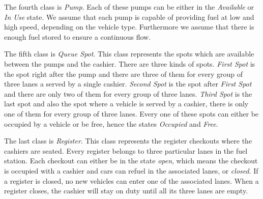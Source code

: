 The fourth class is \textit{Pump}.
Each of these pumps can be either in the \textit{Available} or \textit{In Use} state.
We assume that each pump is capable of providing fuel at low and high speed, depending on the vehicle type.
Furthermore we assume that there is enough fuel stored to ensure a continuous flow.

The fifth class is \textit{Queue Spot}.
This class represents the spots which are available between the pumps and the cashier.
There are three kinds of spots.
\textit{First Spot} is the spot right after the pump and there are three of them for every group of three lanes a served by a single cashier.
\textit{Second  Spot} is the spot after \textit{First Spot} and there are only two of them for every group of three lanes.
\textit{Third Spot} is the last spot and also the spot where a vehicle is served by a cashier, there is only one of them for every group of three lanes.
Every one of these spots can either be occupied by a vehicle or be free, hence the states \textit{Occupied} and \textit{Free}.

The last class is \textit{Register}.
This class represents the register checkouts where the cashiers are seated. 
Every register belongs to three particular lanes in the fuel station.
Each checkout can either be in the state \textit{open}, which means the checkout is occupied with a cashier and cars can refuel in the associated lanes, or \textit{closed}. 
If a register is closed, no new vehicles can enter one of the associated lanes.
When a register closes, the cashier will stay on duty until all its three lanes are empty.

